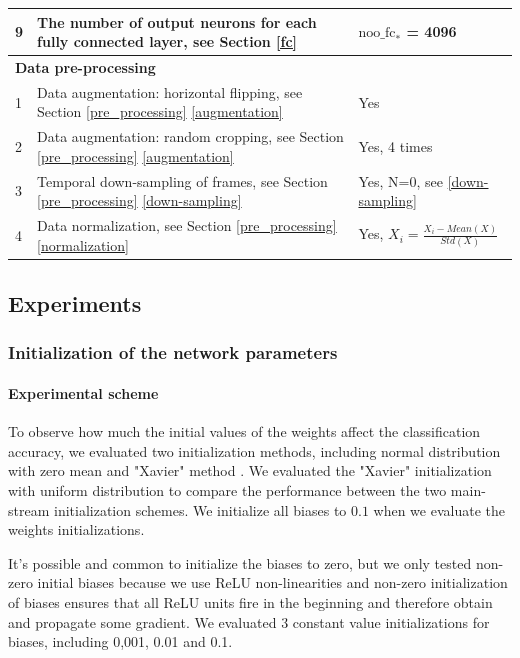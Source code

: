 \begin{table}
\begin{center}
\begin{tabular}{| m{0.6cm} | m{7cm} | m{6cm} |}
  			9 &  The number of output neurons for each fully connected layer, see Section \ref{fc} & \(\text{noo\_fc}_*\) = 4096 \\ \hline \hline                           
  			
  			\multicolumn{3}{|l|}{\textbf{Data pre-processing}}  \\ \hline
  			1 & Data augmentation: horizontal flipping, see Section \ref{pre_processing} \ref{augmentation} & Yes  \\ \hline
  			2 & Data augmentation: random cropping, see Section \ref{pre_processing} \ref{augmentation} & Yes, 4 times \\ \hline
  			3 & Temporal down-sampling of frames, see Section \ref{pre_processing} \ref{down-sampling} & Yes, N=0, see \ref{down-sampling} \\ \hline

  			4 & Data normalization, see Section \ref{pre_processing} \ref{normalization} & Yes, \(X_i = \frac{X_i - Mean(X)}{Std(X)}\) \\ \hline			
  		\end{tabular}
  		\label{table:default_paras}
  	\end{center}
  \end{table} 
   
\subsection{Experiments}
\subsubsection{Initialization of the network parameters}
\paragraph{Experimental scheme}
To observe how much the initial values of the weights affect the classification accuracy,  we evaluated two initialization methods, including normal distribution with zero mean  and "Xavier" method \cite{xavier}. We evaluated the "Xavier" initialization with uniform distribution to compare the performance between the two main-stream initialization schemes. We initialize all biases to \(0.1\) when we evaluate the weights initializations.
\par 
It's possible and common to initialize the biases to zero, but we only tested non-zero initial biases  because we use ReLU non-linearities and non-zero initialization of biases ensures that all ReLU units fire in the beginning and therefore obtain and propagate some gradient. We evaluated 3 constant value initializations for biases, including 0,001, 0.01 and 0.1. 

